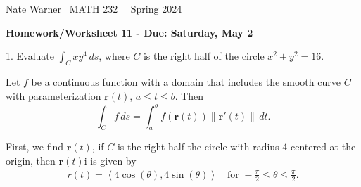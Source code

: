 \documentclass{report}
\title{\Huge{}}
\author{\huge{Nathan Warner}}
\date{\huge{}}
\begin{document}
    \pagebreak \bigbreak \noindent
    Nate Warner \ \quad \quad \quad \quad \quad \quad \quad \quad \quad \quad \quad \quad  MATH 232 \quad  \quad \quad \quad \quad \quad \quad \quad \quad \ \ \quad \quad Spring 2024
    \begin{center}
        \textbf{Homework/Worksheet 11 - Due: Saturday, May 2}
    \end{center}
    \bigbreak \noindent 
    \begin{mdframed}
        1. Evaluate $\int_C xy^4 \, ds$, where \(C\) is the right half of the circle \(x^2 + y^2 = 16\).
    \end{mdframed}
    \bigbreak \noindent 
    \begin{remark}
        Let \(f\) be a continuous function with a domain that includes the smooth curve \(C\) with parameterization \(\mathbf{r}(t)\), \(a \leq t \leq b\). Then
        \[
            \int_C f\,ds = \int_a^b f(\mathbf{r}(t)) \|\mathbf{r}'(t)\|\,dt.
        \]
    \end{remark}
    \bigbreak \noindent 
    First, we find $\mathbf{r}(t)$, if $C$ is the right half the circle with radius 4 centered at the origin, then $\mathbf{r}(t)$i is given by
    \begin{align*}
        r(t) = \left\langle 4\cos{\left(\theta \right)}, 4\sin{\left(\theta \right)} \right\rangle \quad \text{for } -\frac{\pi}{2} \leq \theta  \leq\frac{\pi}{2}
    .\end{align*}
\end{document}
